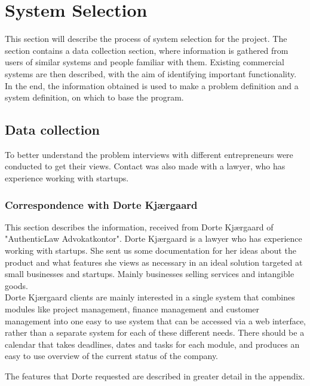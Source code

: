 \section{System Selection}
This section will describe the process of system selection for the project. The section contains a data collection section, where information is gathered from users of similar systems and people familiar with them. Existing commercial systems are then described, with the aim of identifying important functionality. In the end, the information obtained is used to make a problem definition and a system definition, on which to base the program.

\subsection{Data collection}
To better understand the problem interviews with different entrepreneurs were conducted to get their views. Contact was also made with a lawyer, who has experience working with startups. 

\subsubsection{Correspondence with Dorte Kjærgaard}
This section describes the information, received from Dorte Kjærgaard of "AuthenticLaw Advokatkontor". Dorte Kjærgaard is a lawyer who has experience working with startups.
She sent us some documentation for her ideas about the product and what features she views as necessary in an ideal solution targeted at small businesses and startups. Mainly businesses selling services and intangible goods. %
\\
Dorte Kjærgaard clients are mainly interested in a single system that combines modules like project management, finance management and customer management into one easy to use system that can be accessed via a web interface, rather than a separate system for each of these different needs. There should be a calendar that takes deadlines, dates and tasks for each module, and produces an easy to use overview of the current status of the company.

The features that Dorte requested are described in greater detail in the appendix.




